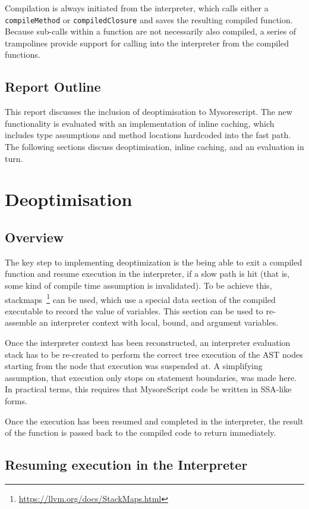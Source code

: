 \documentclass[journal,comsoc]{IEEEtran}
\begin{document}
Compilation is always initiated from the interpreter, which calls either a \lstinline|compileMethod| or \lstinline|compiledClosure| and saves the resulting compiled function. Because sub-calls within a function are not necessarily also compiled, a series of trampolines provide support for calling into the interpreter from the compiled functions.

\subsection{Report Outline}

This report discusses the inclusion of deoptimisation to Mysorescript. The new functionality is evaluated with an implementation of inline caching, which includes type assumptions and method locations hardcoded into the fast path. The following sections discuss deoptimisation, inline caching, and an evaluation in turn.


\section{Deoptimisation}
\subsection{Overview} 

The key step to implementing deoptimization is the being able to exit a compiled function and resume execution in the interpreter, if a slow path is hit (that is, some kind of compile time assumption is invalidated). To be achieve this, stackmaps~\footnote{\url{https://llvm.org/docs/StackMaps.html}} can be used, which use a special data section of the compiled executable to record the value of variables. This section can be used to re-assemble an interpreter context with local, bound, and argument variables. 

Once the interpreter context has been reconstructed, an interpreter evaluation stack has to be re-created to perform the correct tree execution of the AST nodes starting from the node that execution was suspended at. A simplifying assumption, that execution only stops on statement boundaries, was made here. In practical terms, this requires that MysoreScript code be written in SSA-like forms.

Once the execution has been resumed and completed in the interpreter, the result of the function is passed back to the compiled code to return immediately.
	
\subsection{Resuming execution in the Interpreter}
\end{document}
